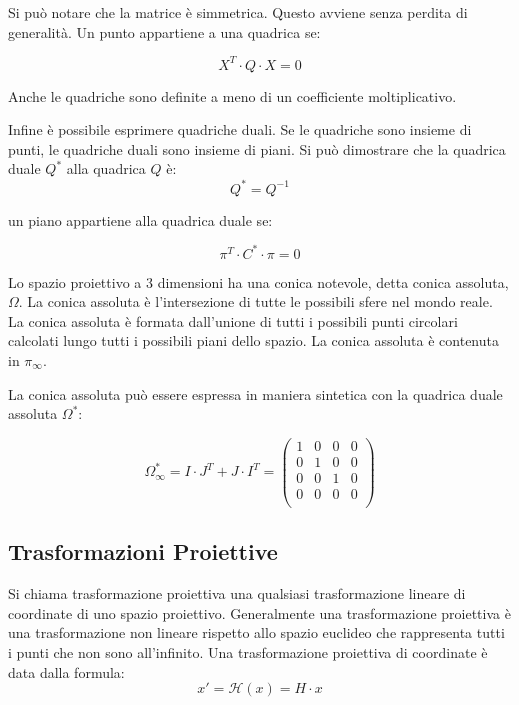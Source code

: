 Si può notare che la matrice è simmetrica. Questo avviene senza perdita di generalità.
Un punto appartiene a una quadrica se:

\begin{equation*}
 X^T\cdot Q \cdot X = 0
\end{equation*}

Anche le quadriche sono definite a meno di un coefficiente moltiplicativo.

Infine è possibile esprimere quadriche duali. Se le quadriche sono insieme di punti, le quadriche duali sono insieme di piani.
Si può dimostrare che la quadrica duale $Q^*$ alla quadrica $Q$ è:
\begin{equation*}
 Q^*=Q^{-1}
\end{equation*}

un piano appartiene alla quadrica duale se:

\begin{equation*}
 \pi^T\cdot C^* \cdot \pi = 0
\end{equation*}

Lo spazio proiettivo a 3 dimensioni ha una conica notevole, detta conica assoluta, $\Omega$. La conica assoluta è l'intersezione di tutte le possibili sfere nel mondo reale. La conica assoluta è formata dall'unione di tutti i possibili punti circolari calcolati lungo tutti i possibili piani dello spazio.
La conica assoluta è contenuta in $\pi_\infty$.

La conica assoluta può essere espressa in maniera sintetica con la quadrica duale assoluta $\Omega^*$:

\begin{equation*}
 \Omega^*_\infty = I\cdot J^T + J\cdot I^T =\begin{pmatrix} 1 & 0 & 0 & 0 \\ 0 & 1 & 0 & 0 \\ 0 & 0 & 1 & 0 \\ 0 & 0 & 0 & 0 \\ \end{pmatrix}
\end{equation*}

\subsection{Trasformazioni Proiettive}

Si chiama trasformazione proiettiva una qualsiasi trasformazione lineare di coordinate di uno spazio proiettivo.
Generalmente una trasformazione proiettiva è una trasformazione non lineare rispetto allo spazio euclideo che rappresenta tutti i punti che non sono all'infinito.
Una trasformazione proiettiva di coordinate è data dalla formula:
\begin{equation*}
 x' = \mathcal{H}(x) = H\cdot x
\end{equation*}

